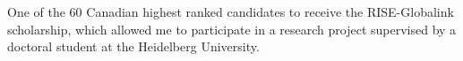 \documentclass[]{deedy-resume-openfont}
\begin{document}
\descript{}
One of the 60 Canadian highest ranked candidates to receive the RISE-Globalink scholarship, which allowed me to participate in a research project supervised by a doctoral student at the Heidelberg University.
\sectionsep
\end{document}
